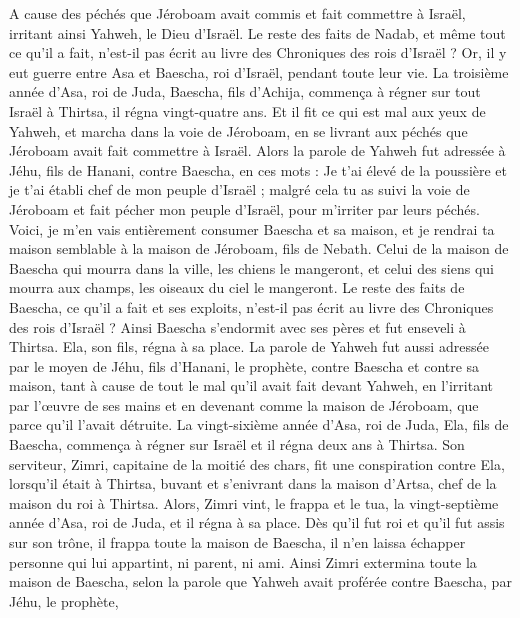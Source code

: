 \begin{multicols}{2}
A cause des péchés que Jéroboam avait commis et fait commettre à Israël, irritant ainsi Yahweh, le Dieu d'Israël.
Le reste des faits de Nadab, et même tout ce qu'il a fait, n'est-il pas écrit au livre des Chroniques des rois d'Israël ?
Or, il y eut guerre entre Asa et Baescha, roi d'Israël, pendant toute leur vie.
La troisième année d'Asa, roi de Juda, Baescha, fils d'Achija, commença à régner sur tout Israël à Thirtsa, il régna vingt-quatre ans.
Et il fit ce qui est mal aux yeux de Yahweh, et marcha dans la voie de Jéroboam, en se livrant aux péchés que Jéroboam avait fait commettre à Israël.
\VerseOne{}Alors la parole de Yahweh fut adressée à Jéhu, fils de Hanani, contre Baescha, en ces mots :
Je t'ai élevé de la poussière et je t'ai établi chef de mon peuple d'Israël ; malgré cela tu as suivi la voie de Jéroboam et fait pécher mon peuple d'Israël, pour m'irriter par leurs péchés.
Voici, je m'en vais entièrement consumer Baescha et sa maison, et je rendrai ta maison semblable à la maison de Jéroboam, fils de Nebath.
Celui de la maison de Baescha qui mourra dans la ville, les chiens le mangeront, et celui des siens qui mourra aux champs, les oiseaux du ciel le mangeront.
Le reste des faits de Baescha, ce qu'il a fait et ses exploits, n'est-il pas écrit au livre des Chroniques des rois d'Israël ?
Ainsi Baescha s'endormit avec ses pères et fut enseveli à Thirtsa. Ela, son fils, régna à sa place.
La parole de Yahweh fut aussi adressée par le moyen de Jéhu, fils d'Hanani, le prophète, contre Baescha et contre sa maison, tant à cause de tout le mal qu'il avait fait devant Yahweh, en l'irritant par l'œuvre de ses mains et en devenant comme la maison de Jéroboam, que parce qu'il l'avait détruite.
La vingt-sixième année d'Asa, roi de Juda, Ela, fils de Baescha, commença à régner sur Israël et il régna deux ans à Thirtsa.
Son serviteur, Zimri, capitaine de la moitié des chars, fit une conspiration contre Ela, lorsqu'il était à Thirtsa, buvant et s'enivrant dans la maison d'Artsa, chef de la maison du roi à Thirtsa.
Alors, Zimri vint, le frappa et le tua, la vingt-septième année d'Asa, roi de Juda, et il régna à sa place.
Dès qu’il fut roi et qu'il fut assis sur son trône, il frappa toute la maison de Baescha, il n'en laissa échapper personne qui lui appartint, ni parent, ni ami.
Ainsi Zimri extermina toute la maison de Baescha, selon la parole que Yahweh avait proférée contre Baescha, par Jéhu, le prophète,

\end{multicols}
